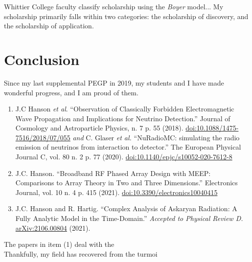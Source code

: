 \documentclass[../../main.tex]{subfiles}
\begin{document}
\label{sec:scholarship}

Whittier College faculty classify scholarship using the \textit{Boyer} model...  My scholarship primarily falls within two categories: the scholarship of discovery, and the scholarship of application. 

\begin{flushleft}

\end{flushleft}

\begin{flushleft}

\end{flushleft}

\begin{flushleft}

\end{flushleft}

\begin{flushleft}

\end{flushleft}

\section{Conclusion}

Since my last supplemental PEGP in 2019, my students and I have made wonderful progress, and I am proud of them.
\begin{enumerate}
\item J.C Hanson \textit{et al}.  ``Observation of Classically Forbidden Electromagnetic Wave Propagation and Implications for Neutrino Detection.''  Journal of Cosmology and Astroparticle Physics, n. 7 p. 55 (2018). \url{doi:10.1088/1475-7516/2018/07/055} \textit{and} C. Glaser \textit{et al.} ``NuRadioMC: simulating the radio emission of neutrinos from interaction to detector.'' The European Physical Journal C, vol. 80 n. 2 p. 77 (2020).  \url{doi:10.1140/epjc/s10052-020-7612-8}
\item J.C. Hanson.  ``Broadband RF Phased Array Design with MEEP: Comparisons to Array Theory in Two and Three Dimensions.''  Electronics Journal, vol. 10 n. 4 p. 415 (2021).  \url{doi:10.3390/electronics10040415}
\item J.C. Hanson and R. Hartig. ``Complex Analysis of Askaryan Radiation: A Fully Analytic Model in the Time-Domain.'' \textit{Accepted to Physical Review D.} \url{arXiv:2106.00804} (2021).
\end{enumerate}
The papers in item (1) deal with the
\\
\vspace{0.25cm}
Thankfully, my field has recovered from the turmoi
\end{document}
